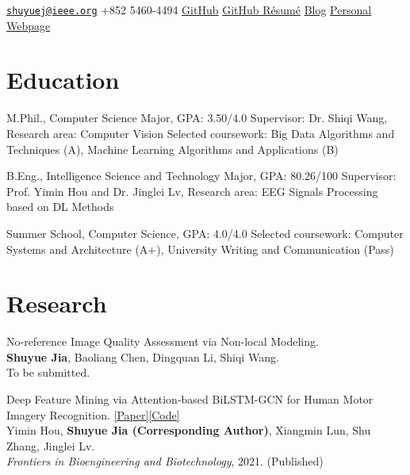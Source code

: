 \documentclass{my_cv}
\begin{document}
\hspace*{\fill}


\hspace*{\fill}

\longcontact
{\href{mailto:shuyuej@ieee.org}{\nolinkurl{shuyuej@ieee.org}}}
{+852 5460-4494}
{\href{https://github.com/SuperBruceJia}{GitHub}}
{\href{https://resume.github.io/?SuperBruceJia}{GitHub R\'esum\'e}}
{\href{http://shuyuej.com/blog}{Blog}}
{\href{https://shuyuej.com/}{Personal Webpage}}

\hspace*{\fill}

\section{Education}
\workitemsthree
{M.Phil., Computer Science Major, GPA: 3.50/4.0}
{Supervisor: Dr. Shiqi Wang, Research area: Computer Vision}
{Selected coursework: Big Data Algorithms and Techniques (A), Machine Learning Algorithms and Applications (B)}

\workitemstwo
{B.Eng., Intelligence Science and Technology Major, GPA: 80.26/100}
{Supervisor: Prof. Yimin Hou and Dr. Jinglei Lv, Research area: EEG Signals Processing based on DL Methods}

\workitemstwo
{Summer School, Computer Science, GPA: 4.0/4.0}
{Selected coursework: Computer Systems and Architecture (A+), University Writing and Communication (Pass)}

\hspace*{\fill}

\section{Research}

\workitemsone
{No-reference Image Quality Assessment via Non-local Modeling. \\
	\textbf{Shuyue Jia}, Baoliang Chen, Dingquan Li, Shiqi Wang. \\
	To be submitted.
}

\hspace*{\fill}

\workitemsone
{Deep Feature Mining via Attention-based BiLSTM-GCN for Human Motor Imagery Recognition. \href{https://www.frontiersin.org/articles/10.3389/fbioe.2021.706229/abstract}{[Paper]}\href{https://github.com/SuperBruceJia/EEG-DL}{[Code]}\\
	Yimin Hou, \textbf{Shuyue Jia (Corresponding Author)}, Xiangmin Lun, Shu Zhang, Jinglei Lv. \\
	\emph{Frontiers in Bioengineering and Biotechnology}, 2021. (Published)
}
\end{document}
